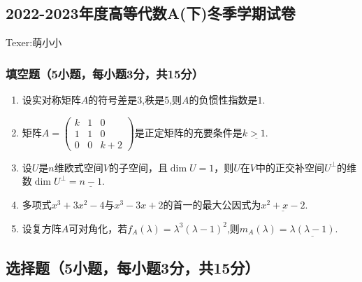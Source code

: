 \subsection{2022-2023年度高等代数A(下)冬季学期试卷}

\begin{center}
    Texer:萌小小
\end{center}

\subsubsection*{填空题（5小题，每小题3分，共15分）}

\begin{enumerate}
    \item 设实对称矩阵$A$的符号差是3,秩是5,则$A$的负惯性指数是\underline{$1$}.
    \item 矩阵$A=\begin{pmatrix}
        k &1 &0\\
        1 &1 &0\\
        0 &0 &k+2
    \end{pmatrix}$是正定矩阵的充要条件是$k\underline{> 1}$.
    \item 设$U$是$n$维欧式空间$V$的子空间，且$\operatorname{dim} U=1$，则$U$在$V$中的正交补空间$U^{\bot }$的维数$\operatorname{dim} U^{\bot }=\underline{n-1}$.
    \item 多项式$x^3+3x^2-4$与$x^3-3x+2$的首一的最大公因式为$\underline{x^2+x-2}$.
    \item 设复方阵$A$可对角化，若$f_A(\lambda)=\lambda^3 (\lambda-1)^2$,则$m_A(\lambda)=\underline{\lambda(\lambda-1)}$.
\end{enumerate}

\subsection*{选择题（5小题，每小题3分，共15分）}

